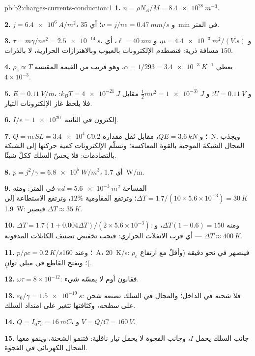 \begin{solution}{pb:b2:charges-currents-conduction:1}
\textbf{1.} $n = \rho N_A/M = \qty{8.4e28}{m^{-3}}$.

\textbf{2.} $j = \qty{6.4e6}{A/m^2}$، و $v = j/ne = \qty{0.47}{mm/s}$؛ أي \qty{35}{min} في المتر.

\textbf{3.} $\tau = m\gamma/ne^2 = \qty{2.5e-14}{s}$، و $\mu = \qty{4.4e-3}{m^2/(V.s)}$، و $\ell =
\qty{40}{nm}$، أي $150$ مسافة ذرية: فتصطدم الإلكترونات بالعيوب
وبالاهتزازات الحرارية، لا بالذرات.

\textbf{4.} $\rho_e \propto T$ يعطي $\alpha = 1/293 = \qty{3.4e-3}{K^{-1}}$، وهو قريب من
القيمة المقيسة $4 \times 10^{-3}$.

\textbf{5.} $E = \qty{0.11}{V/m}$، و $U = \qty{0.11}{V}$؛ و $\tfrac12mv^2 = \qty{1e-37}{J}$ مقابل
$k_BT = \qty{4e-21}{J}$: فلا يلحظ غاز الإلكترونات التيار.

\textbf{6.} $I/e = \qty{1e20}{}$ إلكترون في الثانية.

\textbf{7.} $Q = neSL = \qty{3.4e4}{C}$؛ و $QE = \qty{3.6}{kN}$، مقابل ثقل مقداره
\qty{0.2}{N}. ويجذب المجال الشبكةَ الموجبة بالقوة
المعاكسة؛ وتسلّم الإلكترونات كمية حركتها إلى الشبكة بالتصادمات:
فلا يحسّ السلك ككلّ شيئًا.

\textbf{8.} $p = j^2/\gamma = \qty{6.8e5}{W/m^3}$، أي \qty{1.7}{W/m}.

\textbf{9.} المساحة $\pi d = \qty{5.6e-3}{m^2}$ في المتر: ومنه $\Delta T = 1.7/(10 \times 5.6 \times
10^{-3}) = \qty{30}{K}$؛ وترتفع المقاومية $12\%$، وترتفع الاستطاعة إلى \qty{1.9}{W}:
فيصير $\Delta T \approx \qty{35}{K}$.

\textbf{10.} $\Delta T = 1.7(1 + 0.004\Delta T)/(2 \times 5.6 \times 10^{-3})$: ومنه $\Delta T(1 - 0.6) = 150$،
و $\Delta T \approx \qty{400}{K}$ --- أي قرب الانفلات الحراري: فيجب تخفيض
تصنيف الكابلات المدفونة.

\textbf{11.} $p/\rho c = \qty{0.2}{K/s}$؛ وعند \qty{160}{A}، \qty{20}{K/s}: فينصهر في
نحو دقيقة (وأقلّ مع ارتفاع $\rho_e$)؛ ويفتح القاطع في ميلي ثوانٍ.

\textbf{12.} $\omega\tau = 8 \times 10^{-12}$: فقانون أوم لا يمسّه شيء.

\textbf{13.} $\varepsilon_0/\gamma = \qty{1.5e-19}{s}$: فلا شحنة في الداخل؛ والمجال في
السلك تصنعه شحن على \emph{سطحه}، وكثافتها تتغير
على امتداد السلك.

\textbf{14.} $Q = I_0\tau_c = \qty{16}{mC}$، و $V = Q/C = \qty{160}{V}$.

\textbf{15.} جانب السلك يحمل $I$، وجانب الفجوة لا يحمل تيار
ناقلية: فتنمو الشحنة، وينمو معها المجال الكهربائي في الفجوة.


\end{solution}
